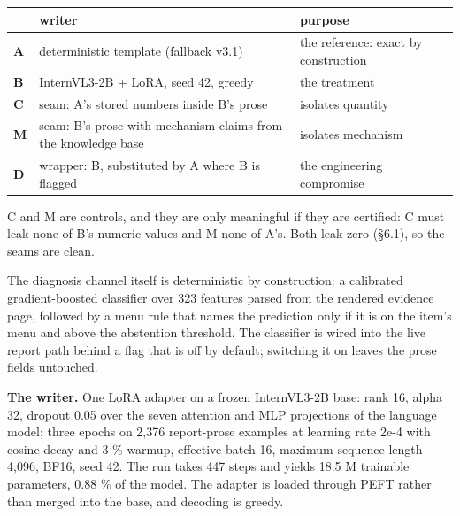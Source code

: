 \documentclass[
  10pt,
]{article}
\begin{document}
\begin{longtable}[]{@{}
  >{\raggedright\arraybackslash}p{}
  >{\raggedright\arraybackslash}p{}
  >{\raggedright\arraybackslash}p{}@{}}
\toprule\noalign{}
\begin{minipage}[b]{\linewidth}\raggedright
\end{minipage} & \begin{minipage}[b]{\linewidth}\raggedright
writer
\end{minipage} & \begin{minipage}[b]{\linewidth}\raggedright
purpose
\end{minipage} \\
\midrule\noalign{}
\endhead
\bottomrule\noalign{}
\endlastfoot
\textbf{A} & deterministic template (fallback v3.1) & the reference:
exact by construction \\
\textbf{B} & InternVL3-2B + LoRA, seed 42, greedy & the treatment \\
\textbf{C} & seam: A's stored numbers inside B's prose & isolates
quantity \\
\textbf{M} & seam: B's prose with mechanism claims from the knowledge
base & isolates mechanism \\
\textbf{D} & wrapper: B, substituted by A where B is flagged & the
engineering compromise \\
\end{longtable}

C and M are controls, and they are only meaningful if they are
certified: C must leak none of B's numeric values and M none of A's.
Both leak zero (\S6.1), so the seams are clean.

The diagnosis channel itself is deterministic by construction: a
calibrated gradient-boosted classifier over 323 features parsed from the
rendered evidence page, followed by a menu rule that names the
prediction only if it is on the item's menu and above the abstention
threshold. The classifier is wired into the live report path behind a
flag that is off by default; switching it on leaves the prose fields
untouched.

\textbf{The writer.} One LoRA adapter on a frozen InternVL3-2B base:
rank 16, alpha 32, dropout 0.05 over the seven attention and MLP
projections of the language model; three epochs on 2,376 report-prose
examples at learning rate 2e-4 with cosine decay and 3 \% warmup,
effective batch 16, maximum sequence length 4,096, BF16, seed 42. The
run takes 447 steps and yields 18.5 M trainable parameters, 0.88 \% of
the model. The adapter is loaded through PEFT rather than merged into
the base, and decoding is greedy.
\end{document}
